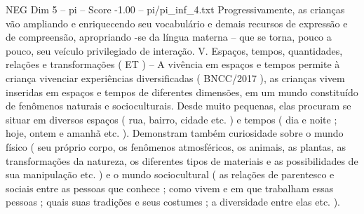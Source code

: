 \begin{textsample}{NEG Dim 5 – pi – Score -1.00 – pi/pi\_inf\_4.txt}
Progressivamente, as crianças vão ampliando e enriquecendo seu vocabulário e demais recursos de expressão e de compreensão, apropriando -se da língua materna – que se torna, pouco a pouco, seu veículo privilegiado de interação.
V.
Espaços, tempos, quantidades, relações e transformações ( ET ) – A vivência em espaços e tempos permite à criança vivenciar experiências diversificadas ( BNCC/2017 ), as crianças vivem inseridas em espaços e tempos de diferentes dimensões, em um mundo constituído de fenômenos naturais e socioculturais.
Desde muito pequenas, elas procuram se situar em diversos espaços ( rua, bairro, cidade etc. ) e tempos ( dia e noite ; hoje, ontem e amanhã etc. ).
Demonstram também curiosidade sobre o mundo físico ( seu próprio corpo, os fenômenos atmosféricos, os animais, as plantas, as transformações da natureza, os diferentes tipos de materiais e as possibilidades de sua manipulação etc. ) e o mundo sociocultural ( as relações de parentesco e sociais entre as pessoas que conhece ; como vivem e em que trabalham essas pessoas ; quais suas tradições e seus costumes ; a diversidade entre elas etc. ).

\end{textsample}
